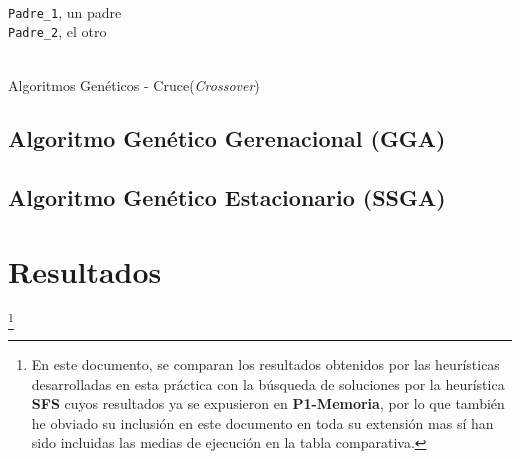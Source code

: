 \documentclass[a4paper, 11pt]{article}
\begin{document}
			
			
			
			\begin{algorithm}[H]
				\begin{algorithmic}[1]
				\REQUIRE \ \\
						\texttt{Padre\_1}, un padre \\
						\texttt{Padre\_2}, el otro \\ \
						
				
				\ENDWHILE
				
				\ENDIF
				
					\ELSE
					\ENDIF
				\ENDFOR
				
				\end{algorithmic}
			\caption{Algoritmos Genéticos - Cruce(\textit{Crossover})}
			\label{GA-Cross}
			\end{algorithm}
			
		\subsection{Algoritmo Genético Gerenacional (\textbf{GGA})}
			
		\subsection{Algoritmo Genético Estacionario (\textbf{SSGA})}
		
	\section{Resultados}\footnote{En este documento, se comparan los resultados obtenidos por las
	heurísticas desarrolladas en esta práctica con la búsqueda de soluciones por la heurística
	\textbf{SFS} cuyos resultados ya se expusieron en \textbf{P1-Memoria}, por lo que también he
	obviado su inclusión en este documento en toda su extensión mas sí han sido incluidas las medias
	de ejecución en la tabla comparativa.}
\end{document}
